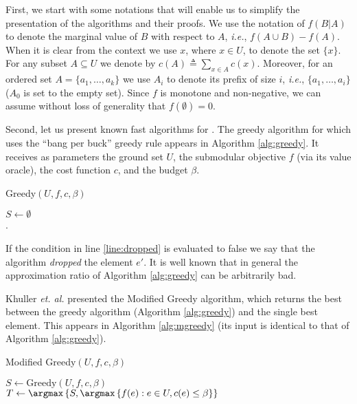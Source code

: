First, we start with some notations that will enable us to simplify the presentation of the algorithms and their proofs.
We use the notation of $f(B|A)$ to denote the marginal value of $B$ with respect to $A$, {\em i.e.}, $f(A\cup B)-f(A)$.
When it is clear from the context we use $x$, where $x\in U$, to denote the set $\{ x\}$.
For any subset $A\subseteq U$ we denote by $c(A)\triangleq \sum _{x\in A}c(x)$.
Moreover, for an ordered set $A = \{a_1, \dots, a_k\}$ we use $A_i$ to denote its prefix of size $i$, {\em i.e.}, $\{a_1, \dots, a_i\}$ ($A_0$ is set to the empty set).
Since $f$ is monotone and non-negative, we can assume without loss of generality that $f(\emptyset)=0$.

Second, let us present known fast algorithms for \SK.
The greedy algorithm for \SK which uses the ``bang per buck'' greedy rule appears in Algorithm \ref{alg:greedy}.
It receives as parameters the ground set $U$, the submodular objective $f$ (via its value oracle), the cost function $c$, and the budget $\beta$.

\begin{algorithm}[H]
\caption{Greedy$(U, f, c, \beta)$}
\label{alg:greedy}
$S \leftarrow \emptyset$
\\
.
\end{algorithm}

If the condition in line \ref{line:dropped} is evaluated to false we say that
the algorithm \emph{dropped} the element $e'$.
It is well known that in general the approximation ratio of Algorithm \ref{alg:greedy}
can be arbitrarily bad.

Khuller {\em et. al.} \cite{khuller1999budgeted} presented the Modified Greedy algorithm, which returns the best between the greedy algorithm (Algorithm \ref{alg:greedy}) and the single best element.
This appears in Algorithm \ref{alg:mgreedy} (its input is identical to that of Algorithm \ref{alg:greedy}).

\begin{algorithm}[H]
\caption{Modified Greedy$(U, f, c, \beta)$}
\label{alg:mgreedy}

$S \leftarrow \text{Greedy}(U, f, c, \beta)$
\\
$T \leftarrow \argmax\left\{S, \argmax \left\{f(e):e\in U, c(e)\leq \beta \right\} \right\}$
\\
\end{algorithm}

